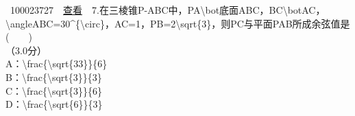 \documentclass[]{article}
\begin{document}
~100023727~~\href{../question/viewQuestionDetail.jsp?questionID=100023727\&testPaperId=100229072}{查看}~~7.在三棱锥P-ABC中，PA\textbackslash{}bot底面ABC，BC\textbackslash{}botAC，\textbackslash{}angleABC=30\^{}\{\textbackslash{}circ\}，AC=1，PB=2\textbackslash{}sqrt\{3\}，则PC与平面PAB所成余弦值是(　　)\\
\hspace*{0.333em}\hspace*{0.333em}（3.0分）\\
\hspace*{0.333em}\hspace*{0.333em}\hspace*{0.333em}\hspace*{0.333em}\hspace*{0.333em}\hspace*{0.333em}\hspace*{0.333em}\hspace*{0.333em}A：\textbackslash{}frac\{\textbackslash{}sqrt\{33\}\}\{6\}\\
\hspace*{0.333em}\hspace*{0.333em}\hspace*{0.333em}\hspace*{0.333em}\hspace*{0.333em}\hspace*{0.333em}\hspace*{0.333em}\hspace*{0.333em}B：\textbackslash{}frac\{\textbackslash{}sqrt\{3\}\}\{3\}\\
\hspace*{0.333em}\hspace*{0.333em}\hspace*{0.333em}\hspace*{0.333em}\hspace*{0.333em}\hspace*{0.333em}\hspace*{0.333em}\hspace*{0.333em}C：\textbackslash{}frac\{\textbackslash{}sqrt\{3\}\}\{6\}\\
\hspace*{0.333em}\hspace*{0.333em}\hspace*{0.333em}\hspace*{0.333em}\hspace*{0.333em}\hspace*{0.333em}\hspace*{0.333em}\hspace*{0.333em}D：\textbackslash{}frac\{\textbackslash{}sqrt\{6\}\}\{3\}
\end{document}

